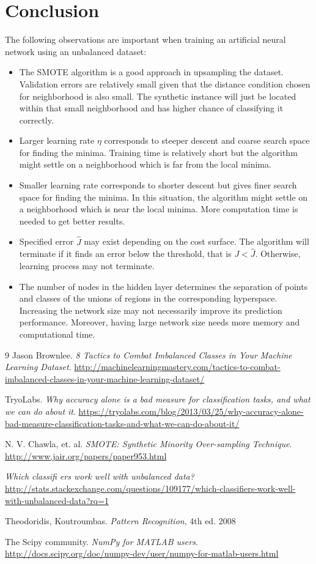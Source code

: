 \documentclass{article}
\begin{document}
\section{Conclusion}
The following observations are important when training an artificial neural network using an unbalanced dataset:
\begin{itemize}
	\item The SMOTE algorithm is a good approach in upsampling the dataset. Validation errors are relatively small given that the distance condition chosen for neighborhood is also small. The synthetic instance will just be located within that small neighborhood and has higher chance of classifying it correctly.
	\item Larger learning rate $\eta$ corresponds to steeper descent and coarse search space for finding the minima. Training time is relatively short but the algorithm might settle on a neighborhood which is far from the local minima.
	\item Smaller learning rate corresponds to shorter descent but gives finer search space for finding the minima. In this situation, the algorithm might settle on a neighborhood which is near the local minima. More computation time is needed to get better results.
	\item Specified error $\hat{J}$ may exist depending on the cost surface. The algorithm will terminate if it finds an error below the threshold, that is $J < \hat{J}$. Otherwise, learning process may not terminate.
	\item The number of nodes in the hidden layer determines the separation of points and classes of the unions of regions in the corresponding hyperspace. Increasing the network size may not necessarily improve its prediction performance. Moreover, having large network size needs more memory and computational time.
\end{itemize}

\begin{thebibliography}{9}
	Jason Brownlee. \emph{8 Tactics to Combat Imbalanced Classes in Your
		Machine Learning Dataset}. \url{http://machinelearningmastery.com/tactics-to-combat-imbalanced-classes-in-your-machine-learning-dataset/}
	
	TryoLabs. \emph{Why accuracy alone is a bad measure for classification tasks, and what we can do about it}. \url{https://tryolabs.com/blog/2013/03/25/why-accuracy-alone-bad-measure-classification-tasks-and-what-we-can-do-about-it/}
	
	N. V. Chawla, et. al. \emph{SMOTE: Synthetic Minority Over-sampling Technique}. \url{http://www.jair.org/papers/paper953.html}
	
	\emph{Which classifi ers work well with unbalanced data?} \url{http://stats.stackexchange.com/questions/109177/which-classifiers-work-well-with-unbalanced-data?rq=1}
	
	Theodoridis, Koutroumbas. \emph{Pattern Recognition}, 4th ed. 2008
	
	The Scipy community. \emph{NumPy for MATLAB users}. \url{http://docs.scipy.org/doc/numpy-dev/user/numpy-for-matlab-users.html}
\end{thebibliography}
\end{document}
